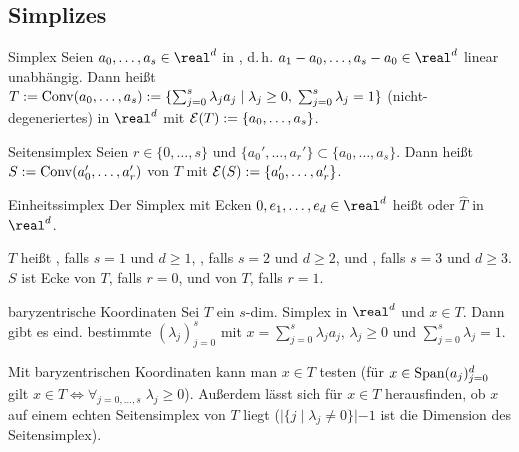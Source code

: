 \pagebreak

\subsection{%
    Simplizes%
}

\begin{Def}{Simplex}
    Seien $a_0, \dotsc, a_s \in \real^d$ in ,
    d.\,h. $a_1 - a_0, \dotsc, a_s - a_0 \in \real^d$ linear unabhängig.
    Dann heißt $T := \operatorname{Conv}(a_0, \dotsc, a_s)
    := \{\sum_{j=0}^s \lambda_j a_j \;|\; \lambda_j \ge 0,\; \sum_{j=0}^s \lambda_j = 1\}$
    (nicht-degeneriertes)  in $\real^d$ mit
     $\mathcal{E}(T) := \{a_0, \dotsc, a_s\}$.
\end{Def}

\begin{Def}{Seitensimplex}
    Seien $r \in \{0, \dotsc, s\}$ und $\{a_0', \dotsc, a_r'\} \subset \{a_0, \dotsc, a_s\}$.
    Dann heißt\\
    $S := \operatorname{Conv}(a_0', \dotsc, a_r')$ 
    von $T$ mit  $\mathcal{E}(S) := \{a_0', \dotsc, a_r'\}$.
\end{Def}

\begin{Def}{Einheitssimplex}
    Der Simplex mit Ecken $0, e_1, \dotsc, e_d \in \real^d$
    heißt  oder  $\widehat{T}$ in $\real^d$.
\end{Def}

\begin{Bem}
    $T$ heißt , falls $s = 1$ und $d \ge 1$,
    , falls $s = 2$ und $d \ge 2$, und
    , falls $s = 3$ und $d \ge 3$.
    $S$ ist Ecke von $T$, falls $r = 0$,
    und  von $T$, falls $r = 1$.
\end{Bem}

\linie

\begin{Lemma}{baryzentrische Koordinaten}
    Sei $T$ ein $s$-dim. Simplex in $\real^d$ und $x \in T$.
    Dann gibt es eind. bestimmte 
    $(\lambda_j)_{j=0}^s$ mit $x = \sum_{j=0}^s \lambda_j a_j$,
    $\lambda_j \ge 0$ und $\sum_{j=0}^s \lambda_j = 1$.
\end{Lemma}

\begin{Bem}
    Mit baryzentrischen Koordinaten kann man $x \in T$ testen
    (für $x \in \operatorname{Span}(a_j)_{j=0}^d$ gilt
    $x \in T \iff \forall_{j=0,\dotsc,s}\; \lambda_j \ge 0$).
    Außerdem lässt sich für $x \in T$ herausfinden, ob $x$ auf einem echten Seitensimplex
    von $T$ liegt
    ($|\{j \;|\; \lambda_j \not= 0\}| - 1$ ist die Dimension des Seitensimplex).
\end{Bem}

